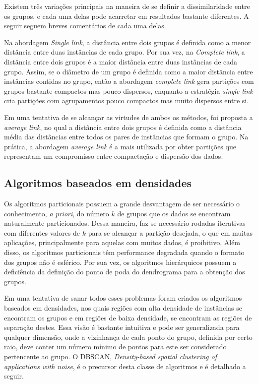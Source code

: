 Existem três variações principais na maneira de se definir a dissimilaridade entre os grupos, e cada uma delas pode acarretar em resultados bastante diferentes. A seguir seguem breves comentários de cada uma delas. 

Na abordagem \emph{Single link}, a distância entre dois grupos é definida como a menor distância entre duas instâncias de cada grupo. Por sua vez, na \emph{Complete link}, a distância entre dois grupos é a maior distância entre duas instâncias de cada grupo. Assim, se o diâmetro de um grupo é definida como a maior distância entre instâncias contidas no grupo, então a abordagem \emph{complete link} gera partições com grupos bastante compactos mas pouco dispersos, enquanto a estratégia \emph{single link} cria partições com agrupamentos pouco compactos mas muito dispersos entre si.

 Em uma tentativa de se alcançar as virtudes de ambos os métodos, foi proposta a \emph{average link}, no qual a distância entre dois grupos é definida como a distância média das distâncias entre todos os pares de instâncias que formam o grupo. Na prática, a abordagem \emph{average link} é a mais utilizada por obter partições que representam um compromisso entre compactação e dispersão dos dados.


\subsection{Algoritmos baseados em densidades}

Os algoritmos particionais possuem a grande desvantagem de ser necessário o conhecimento, \emph{a priori}, do número $k$ de grupos que os dados se encontram naturalmente particionados. Dessa maneira, faz-se necessário rodadas iterativas com diferentes valores de $k$ para se alcançar a partição desejada, o que em muitas aplicações, principalmente para aquelas com muitos dados, é proibitivo. Além disso, os algoritmos particionais têm performance degradada quando o formato dos grupos não é esférico. Por sua vez, os algoritmos hierárquicos possuem a deficiência da definição do ponto de poda do dendrograma para a obtenção dos grupos.

Em uma tentativa de sanar todos esses problemas foram criados os algoritmos baseados em densidades, nos quais regiões com alta densidade de instâncias se encontram os grupos e em regiões de baixa densidade, se encontram as regiões de separação destes. Essa visão é bastante intuitiva e pode ser generalizada para qualquer dimensão, onde a vizinhança de cada ponto do grupo, definida por certo raio, deve conter um número mínimo de pontos para este ser considerado pertencente ao grupo. O DBSCAN, \emph{Density-based spatial clustering of applications with noise}, é o precursor desta classe de algoritmos e é detalhado a seguir.

